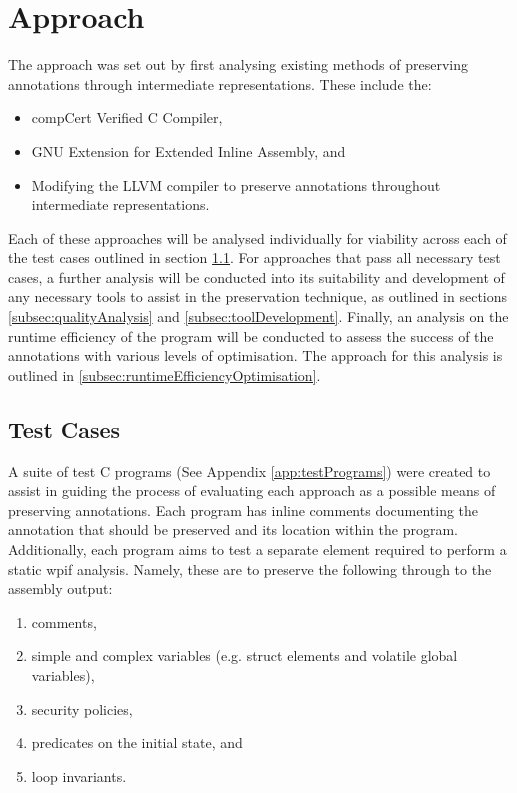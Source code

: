 \section{Approach}
The approach was set out by first analysing existing methods of preserving annotations through intermediate representations. These include the:
\begin{itemize}
    \item compCert Verified C Compiler, 
    \item GNU Extension for Extended Inline Assembly, and
    \item Modifying the LLVM compiler to preserve annotations throughout intermediate representations.
\end{itemize}

Each of these approaches will be analysed individually for viability across each of the test cases outlined in section \ref{subsec:testCases}. For approaches that pass all necessary test cases, a further analysis will be conducted into its suitability and development of any necessary tools to assist in the preservation technique, as outlined in sections \ref{subsec:qualityAnalysis} and \ref{subsec:toolDevelopment}. Finally, an analysis on the runtime efficiency of the program will be conducted to assess the success of the annotations with various levels of optimisation. The approach for this analysis is outlined in \ref{subsec:runtimeEfficiencyOptimisation}.

\subsection{Test Cases}
\label{subsec:testCases}
A suite of test C programs (See Appendix \ref{app:testPrograms}) were created to assist in guiding the process of evaluating each approach as a possible means of preserving annotations. Each program has inline comments documenting the annotation that should be preserved and its location within the program. Additionally, each program aims to test a separate element required to perform a static wpif analysis. Namely, these are to preserve the following through to the assembly output:

\begin{enumerate}
    \item comments,
    \item simple and complex variables (e.g. struct elements and volatile global variables),
    \item security policies,
    \item predicates on the initial state, and
    \item loop invariants.
\end{enumerate}

